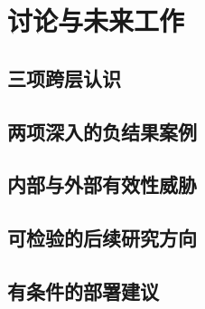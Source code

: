 \chapter{讨论与未来工作}
\label{ch:discussion}

\section{三项跨层认识}
\label{sec:8-1}

\section{两项深入的负结果案例}
\label{sec:8-2}

\section{内部与外部有效性威胁}
\label{sec:8-3}

\section{可检验的后续研究方向}
\label{sec:8-4}

\section{有条件的部署建议}
\label{sec:8-5}

